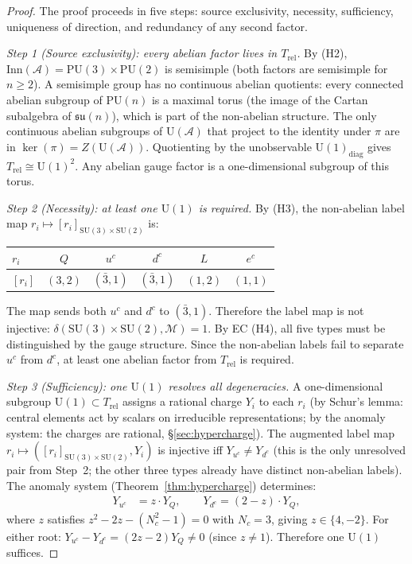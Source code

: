 \documentclass[11pt,a4paper]{article}
\theoremstyle{definition}
\newcommand{\SU}{\mathrm{SU}}
\newcommand{\U}{\mathrm{U}}
\begin{document}
\begin{proof}
The proof proceeds in five steps: source exclusivity, necessity,
sufficiency, uniqueness of direction, and redundancy of any second
factor.

\textit{Step 1 (Source exclusivity): every abelian factor lives in
$T_{\mathrm{rel}}$.}\quad
By (H2), $\mathrm{Inn}(\mathcal{A}) = \mathrm{PU}(3) \times
\mathrm{PU}(2)$ is semisimple (both factors are semisimple for
$n \ge 2$).  A semisimple group has no continuous abelian
quotients: every connected abelian subgroup of $\mathrm{PU}(n)$ is
a maximal torus (the image of the Cartan subalgebra of
$\mathfrak{su}(n)$), which is part of the non-abelian structure.
The only continuous abelian subgroups of $\mathrm{U}(\mathcal{A})$
that project to the identity under $\pi$ are in $\ker(\pi) =
Z(\mathrm{U}(\mathcal{A}))$.  Quotienting by the unobservable
$\mathrm{U}(1)_{\mathrm{diag}}$ gives $T_{\mathrm{rel}} \cong
\mathrm{U}(1)^2$.  Any abelian gauge factor is a one-dimensional
subgroup of this torus.

\textit{Step 2 (Necessity): at least one $\U(1)$ is required.}\quad
By (H3), the non-abelian label map
$r_i \mapsto [r_i]_{\SU(3) \times \SU(2)}$ is:
\begin{center}\small
\begin{tabular}{@{}lccccc@{}}
\toprule
$r_i$ & $Q$ & $u^c$ & $d^c$ & $L$ & $e^c$ \\
\midrule
$[r_i]$ & $(3,2)$ & $(\bar{3},1)$ & $(\bar{3},1)$ & $(1,2)$ & $(1,1)$ \\
\bottomrule
\end{tabular}
\end{center}
The map sends both $u^c$ and $d^c$ to $(\bar{3}, 1)$.  Therefore
the label map is not injective: $\delta(\SU(3) \times \SU(2),
\mathcal{M}) = 1$.  By EC (H4), all five types must be
distinguished by the gauge structure.  Since the non-abelian
labels fail to separate $u^c$ from $d^c$, at least one abelian
factor from $T_{\mathrm{rel}}$ is required.

\textit{Step 3 (Sufficiency): one $\U(1)$ resolves all
degeneracies.}\quad
A one-dimensional subgroup $\U(1) \subset T_{\mathrm{rel}}$ assigns a
rational charge $Y_i$ to each $r_i$ (by Schur's lemma: central
elements act by scalars on irreducible representations; by the anomaly
system: the charges are rational, \S\ref{sec:hypercharge}).  The
augmented label map $r_i \mapsto ([r_i]_{\SU(3) \times \SU(2)},
Y_i)$ is injective iff $Y_{u^c} \ne Y_{d^c}$ (this is the only
unresolved pair from Step~2; the other three types already have
distinct non-abelian labels).  The anomaly system
(Theorem~\ref{thm:hypercharge}) determines:
\begin{align*}
  Y_{u^c} &= z \cdot Y_Q, \qquad Y_{d^c} = (2 - z) \cdot Y_Q,
\end{align*}
where $z$ satisfies $z^2 - 2z - (N_c^2 - 1) = 0$ with $N_c = 3$,
giving $z \in \{4, -2\}$.  For either root:
$Y_{u^c} - Y_{d^c} = (2z - 2) Y_Q \ne 0$ (since $z \ne 1$).
Therefore one $\U(1)$ suffices.


\end{proof}
\end{document}
